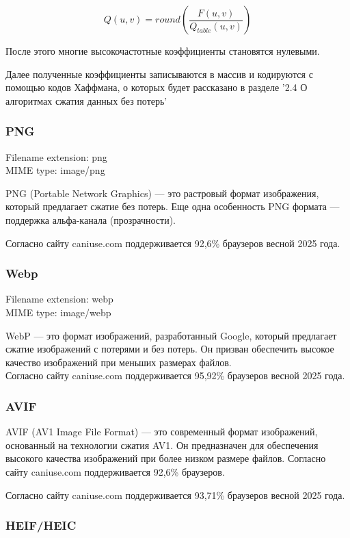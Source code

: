 \documentclass[12pt]{article}
\begin{document}
\[
    Q(u, v) = round(\frac{F(u, v)}{Q_{table}(u, v)})
\]

После этого многие высокочастотные коэффициенты становятся нулевыми.

Далее полученные коэффициенты записываются в массив и кодируются с помощью кодов Хаффмана, о которых
будет рассказано в разделе '2.4 О алгоритмах сжатия данных без потерь'

\subsubsection{PNG}

Filename extension: png\\
MIME type: image/png

PNG (Portable Network Graphics) — это растровый формат изображения, который предлагает сжатие
без потерь. Еще одна особенность PNG формата — поддержка альфа-канала (прозрачности).

Согласно сайту caniuse.com поддерживается 92,6\% браузеров весной 2025 года.

\subsubsection{Webp}
Filename extension: webp\\
MIME type: image/webp

WebP — это формат изображений, разработанный Google, который предлагает сжатие изображений
с потерями и без потерь. Он призван обеспечить высокое качество изображений при меньших размерах файлов.\\

Согласно сайту caniuse.com поддерживается 95,92\% браузеров весной 2025 года.

\subsubsection{AVIF}

AVIF (AV1 Image File Format) — это современный формат изображений,
основанный на технологии сжатия AV1. Он предназначен для обеспечения высокого
качества изображений при более низком размере файлов. Согласно сайту caniuse.com
поддерживается 92,6\% браузеров.

Согласно сайту caniuse.com поддерживается 93,71\% браузеров весной 2025 года.

\subsubsection{HEIF/HEIC}
\end{document}
